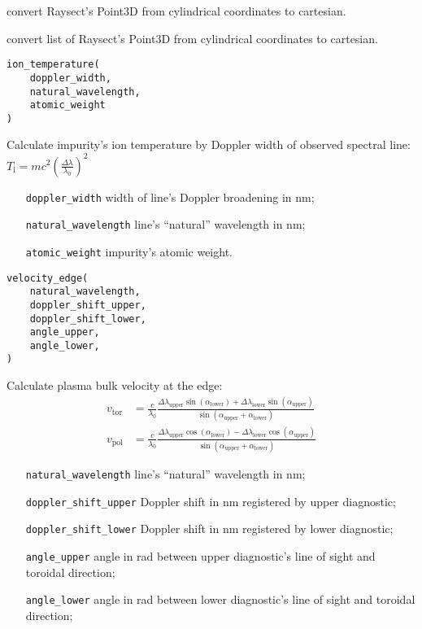 \documentclass[../../main.tex]{subfiles}
\begin{document}
convert Raysect's Point3D from cylindrical coordinates to cartesian.

convert list of Raysect's Point3D from cylindrical coordinates to cartesian.

\begin{verbatim}
ion_temperature(
    doppler_width,
    natural_wavelength,
    atomic_weight
)
\end{verbatim}

Calculate impurity's ion temperature by Doppler width of observed spectral line: \\
$T_\text{i} = m c^2 \left( \frac{\Delta \lambda}{\lambda_0} \right)^2$

\begin{itemize}[align=left]
    \item[\texttt{doppler\_width}] width of line's Doppler broadening in nm;
    \item[\texttt{natural\_wavelength}] line's \enquote{natural} wavelength in nm;
    \item[\texttt{atomic\_weight}] impurity's atomic weight.
\end{itemize}

\begin{verbatim}
velocity_edge(
    natural_wavelength,
    doppler_shift_upper,
    doppler_shift_lower,
    angle_upper,
    angle_lower,
)
\end{verbatim}

Calculate plasma bulk velocity at the edge:
\begin{align*}
    v_{\text{tor}} & = \frac{c}{\lambda_0} \frac{\Delta \lambda_{\text{upper}} \sin(\alpha_{\text{lower}}) + \Delta \lambda_{\text{lower}} \sin(\alpha_{\text{upper}})}{\sin(\alpha_{\text{upper}} + \alpha_{\text{lower}})} \\
    v_{\text{pol}} & = \frac{c}{\lambda_0} \frac{\Delta \lambda_{\text{upper}} \cos(\alpha_{\text{lower}}) - \Delta \lambda_{\text{lower}} \cos(\alpha_{\text{upper}})}{\sin(\alpha_{\text{upper}} + \alpha_{\text{lower}})}
\end{align*}

\begin{itemize}[align=left]
    \item[\texttt{natural\_wavelength}] line's \enquote{natural} wavelength in nm;
    \item[\texttt{doppler\_shift\_upper}] Doppler shift in nm registered by upper diagnostic;
    \item[\texttt{doppler\_shift\_lower}] Doppler shift in nm registered by lower diagnostic;
    \item[\texttt{angle\_upper}] angle in rad between upper diagnostic's line of sight and toroidal direction;
    \item[\texttt{angle\_lower}] angle in rad between lower diagnostic's line of sight and toroidal direction;
\end{itemize}
\end{document}
